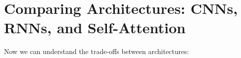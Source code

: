 \documentclass{article}
\begin{document}








\section{Comparing Architectures: CNNs, RNNs, and Self-Attention}

Now we can understand the trade-offs between architectures:
\end{document}
